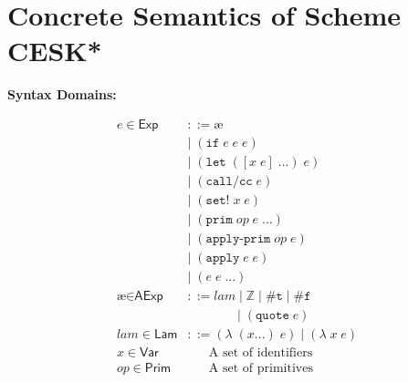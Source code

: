 \documentclass[12pt,draft]{article}
\newcommand\mae{\ensuremath{\text{\ae}}}
\newcommand{\lamsyn}[2]{(\lambda\;(#1 ...)\;#2)}
\newcommand{\vararglamsyn}[2]{(\lambda\;#1\;#2)}
\newcommand{\letsyn}[3]{(\texttt{let}\;([#1\;#2]\;...)\;#3)}
\newcommand{\ifsyn}[3]{(\texttt{if}\;#1\;#2\;#3)}
\newcommand{\primsyn}[2]{(\texttt{prim}\;#1\;#2\;...)}
\newcommand{\applyprimsyn}[2]{(\texttt{apply-prim}\;#1\;#2)}
\newcommand{\applysyn}[2]{(\texttt{apply}\;#1\;#2)}
\newcommand{\callccsyn}[1]{(\texttt{call/cc}\;#1)}
\newcommand{\setsyn}[2]{(\texttt{set!}\;#1\;#2)}
\newcommand{\quotesyn}[1]{(\texttt{quote}\;#1)}
\newcommand{\truesyn}{\texttt{\#t}}
\newcommand{\falsesyn}{\texttt{\#f}}
\begin{document}


\section{Concrete Semantics of Scheme CESK*}

\begin{multicols*}{2}
\begin{center}
\textbf{Syntax Domains:}
\end{center}
\vspace{-18mm}
\begin{center}
\begin{align*}
e \in \textsf{Exp} &::= \mae \\
				&|\; \ifsyn{e}{e}{e} \\
				&|\; \letsyn{x}{e}{e} \\
				&|\; \callccsyn{e} \\
				&|\; \setsyn{x}{e} \\
				&|\; \primsyn{op}{e} \\
				&|\; \applyprimsyn{op}{e} \\
				&|\; \applysyn{e}{e} \\
				&|\; (e\;e\;...) \\
\mae \in \textsf{AExp} &::= lam\;|\; \mathbb{Z}
							\;|\; \truesyn \;|\; \falsesyn \\
				&\;\;\;\;\;\;\;\;\;\;\;\;\;\; |\; \quotesyn{e} \\
lam \in \textsf{Lam} &::= \lamsyn{x}{e} \;|\; \vararglamsyn{x}{e} \\
x \in \textsf{Var}   &\;\;\;\;\;\; \text{A set of identifiers} \\
op \in \textsf{Prim} &\;\;\;\;\;\; \text{A set of primitives}
\end{align*}

\end{center}
\end{multicols*}
\end{document}
